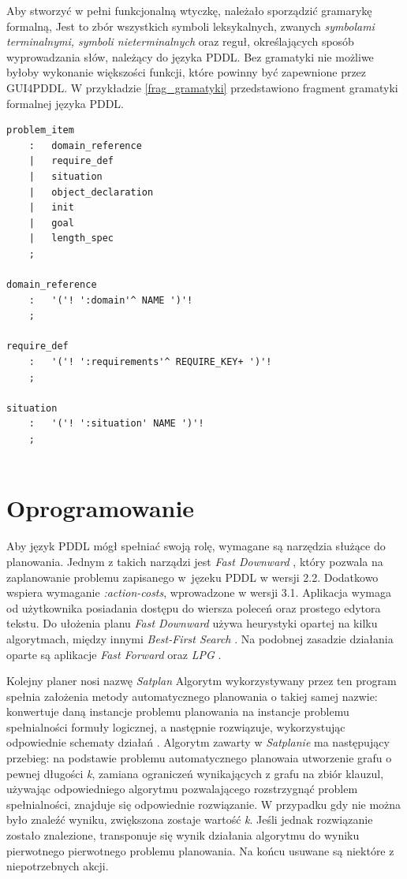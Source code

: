 Aby stworzyć w pełni funkcjonalną wtyczkę, należało sporządzić gramarykę formalną, Jest to zbór wszystkich symboli leksykalnych, zwanych \emph{symbolami terminalnymi, symboli nieterminalnych} oraz reguł, określających sposób wyprowadzania słów, należący do języka PDDL. Bez gramatyki nie możliwe byłoby wykonanie większości funkcji, które powinny być zapewnione przez GUI4PDDL. W przykładzie \ref{frag_gramatyki} przedstawiono fragment gramatyki formalnej języka PDDL.\\
\begin{Code}
\begin{lstlisting}[language=LISP,frame=single,label={frag_gramatyki}, caption={Fragment gramatyki formalnej}]
problem_item
	:	domain_reference
	|	require_def
	|	situation
	|	object_declaration
	|	init
	|	goal
	|	length_spec
	;

domain_reference 
	:	'('! ':domain'^ NAME ')'!
	;
	
require_def
	:	'('! ':requirements'^ REQUIRE_KEY+ ')'!
	;
	
situation 
	:	'('! ':situation' NAME ')'!
	;
	
\end{lstlisting}
\end{Code} 
\section{Oprogramowanie}
\label{sec:oprogramowanie}
Aby język PDDL mógł spełniać swoją rolę, wymagane są narzędzia służące do planowania. Jednym z takich narządzi jest \textit{Fast Downward} \cite{fastdownward}, który pozwala na zaplanowanie problemu zapisanego w~jęzeku PDDL w wersji 2.2. Dodatkowo wspiera wymaganie \textit{:action-costs}, wprowadzone w wersji 3.1. Aplikacja wymaga od użytkownika posiadania dostępu do wiersza poleceń oraz prostego edytora tekstu. Do ułożenia planu \textit{Fast Downward} używa heurystyki opartej na kilku algorytmach, między innymi \textit{Best-First Search} \cite{fdalgorytm}. Na podobnej zasadzie działania oparte są aplikacje \textit{Fast Forward} \cite{fastforward} oraz \textit{LPG} \cite{lpg}.

Kolejny planer nosi nazwę \textit{Satplan}\cite{satplanprog} Algorytm wykorzystywany przez ten program spełnia założenia metody automatycznego planowania o takiej samej nazwie: konwertuje daną instancje problemu planowania na instancje problemu spełnialności formuły logicznej, a następnie rozwiązuje, wykorzystując odpowiednie schematy działań \cite{satplan}. Algorytm zawarty w \textit{Satplanie} ma następujący przebieg: na podstawie problemu automatycznego planowaia utworzenie grafu o pewnej długości \textit{k}, zamiana ograniczeń wynikających z grafu na zbiór klauzul, używając odpowiedniego algorytmu pozwalającego rozstrzygnąć problem spełnialności, znajduje się odpowiednie rozwiązanie. W przypadku gdy nie można było znaleźć wyniku, zwiększona zostaje wartość \textit{k}. Jeśli jednak rozwiązanie zostało znalezione, transponuje się wynik działania algorytmu do wyniku pierwotnego pierwotnego problemu planowania. Na końcu usuwane są niektóre z niepotrzebnych akcji.

